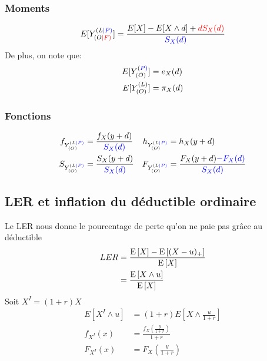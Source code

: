 \documentclass[10pt, french]{article}
\begin{document}
\begin{multicols*}{3}
\subsubsection*{Moments}
\begin{align*}
E[Y_{(O\textcolor{red}{|F)}}^{(L\textcolor{blue}{|P)}}] &= \frac{E[X] - E[X \wedge d] + \textcolor{red}{d S_X(d)} }{\textcolor{blue}{S_X(d)}} \\
\end{align*}
De plus, on note que:
\begin{align*}
E[Y_{(O)}^{(\textcolor{blue}{P)}}] &= e_X(d) \\
E[Y_{(O)}^{(L)}] &= \pi_X(d)
\end{align*}

\subsubsection*{Fonctions}
\begin{align*}
f_{Y^{(L\textcolor{blue}{|P)}}_{(O)}} &= \frac{f_X(y+d)}{\textcolor{blue}{S_X(d)}} &
h_{Y^{(L\textcolor{blue}{|P)}}_{(O)}} &= h_X(y+d) \\
S_{Y^{(L\textcolor{blue}{|P)}}_{(O)}} &= \frac{S_X(y+d)}{\textcolor{blue}{S_X(d)}} &
F_{Y^{(L\textcolor{blue}{|P)}}_{(O)}} &= \frac{F_X(y+d) \textcolor{blue}{- F_X(d)}}{\textcolor{blue}{S_X(d)}} \\
\end{align*}


\subsection*{LER et inflation du déductible ordinaire}
Le LER nous donne le pourcentage de perte qu'on ne paie pas grâce au déductible
\begin{align*}
	LER 	 &= \frac{\mathrm{E} \left[ X \right] - \mathrm{E} \left[ (X-u)_+ \right]}{\mathrm{E} \left[ X \right]} \\
	     &= \frac{\mathrm{E} \left[ X \wedge u \right]}{\mathrm{E} \left[ X \right]} 
\end{align*}
Soit $X^I = (1 + r) X$
\begin{align*}
	E[{X^I} \wedge u]	 &= (1 + r) E[X \wedge \frac{u}{1 + r}] \\
	f_{X^I}(x) &= \frac{f_X\left(\frac{y}{1 + r}\right)}{1 + r} \\
	F_{X^I}(x) &= F_X\left(\frac{y}{1 + r}\right)
\end{align*}


\end{multicols*}
\end{document}
